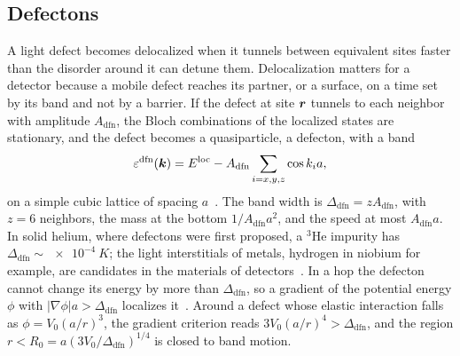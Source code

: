 \subsection{Defectons}\label{sec:19.6-defecton}

A light defect becomes delocalized when it tunnels between equivalent sites faster than the disorder around it can detune them. Delocalization matters for a detector because a mobile defect reaches its partner, or a surface, on a time set by its band and not by a barrier. If the defect at site $\bm{r}$ tunnels to each neighbor with amplitude $A_{\mathrm{dfn}}$, the Bloch combinations of the localized states are stationary, and the defect becomes a quasiparticle, a defecton, with a band
\begin{equation}
  \varepsilon^{\mathrm{dfn}}(\bm{k}) = E^{\mathrm{loc}} - A_{\mathrm{dfn}}\sum_{i=x,y,z}\cos k_ia ,
  \label{eq:19.6-band}
\end{equation}
on a simple cubic lattice of spacing $a$~\cite[Eqs.~(1)--(3)]{pushkarov2004quantum}. The band width is $\Delta_{\mathrm{dfn}} = zA_{\mathrm{dfn}}$, with $z = 6$ neighbors, the mass at the bottom $1/A_{\mathrm{dfn}}a^2$, and the speed at most $A_{\mathrm{dfn}}a$. In solid helium, where defectons were first proposed, a ${}^3$He impurity has $\Delta_{\mathrm{dfn}} \sim \SI{e-4}{K}$; the light interstitials of metals, hydrogen in niobium for example, are candidates in the materials of detectors~\cite{pushkarov2004quantum}. In a hop the defecton cannot change its energy by more than $\Delta_{\mathrm{dfn}}$, so a gradient of the potential energy $\phi$ with $|\nabla\phi|a > \Delta_{\mathrm{dfn}}$ localizes it~\cite[Eq.~(17)]{pushkarov2004quantum}. Around a defect whose elastic interaction falls as $\phi = V_0(a/r)^3$, the gradient criterion reads $3V_0(a/r)^4 > \Delta_{\mathrm{dfn}}$, and the region $r < R_0 = a(3V_0/\Delta_{\mathrm{dfn}})^{1/4}$ is closed to band motion.

